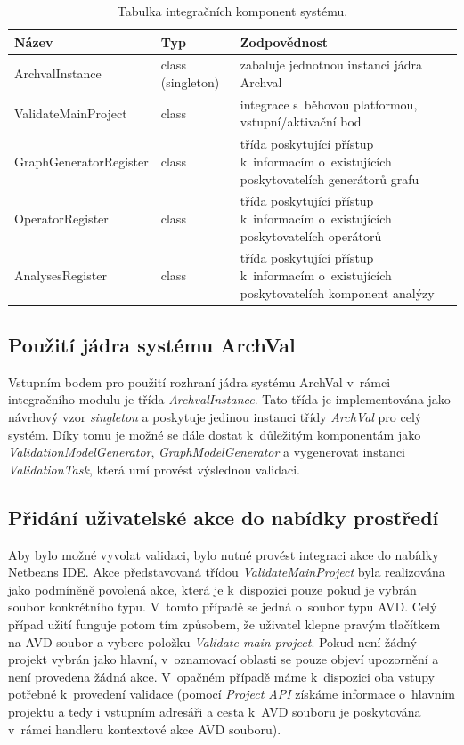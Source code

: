 \begin{table}
  \caption{Tabulka integračních komponent systému. \label{implementation-integration_components}}
  \begin{center}
    \begin{tabular}{ | l | l | p{8cm} | }
      \hline
      \textbf{Název} & \textbf{Typ} & \textbf{Zodpovědnost} \\
      \hline
      \hline
      ArchvalInstance & class (singleton) & zabaluje jednotnou instanci jádra Archval \\ \hline
      ValidateMainProject & class & integrace s~běhovou platformou, vstupní/aktivační bod \\ \hline
      GraphGeneratorRegister & class & třída poskytující přístup k~informacím o~existujících poskytovatelích generátorů grafu \\ \hline
      OperatorRegister & class & třída poskytující přístup k~informacím o~existujících poskytovatelích operátorů \\ \hline
      AnalysesRegister & class & třída poskytující přístup k~informacím o~existujících poskytovatelích komponent analýzy \\ \hline
    \end{tabular}
  \end{center}
\end{table}

\subsection{Použití jádra systému ArchVal}
Vstupním bodem pro použití rozhraní jádra systému ArchVal v~rámci integračního modulu je třída \emph{ArchvalInstance}. Tato třída je implementována jako návrhový vzor \emph{singleton} a poskytuje jedinou instanci třídy \emph{ArchVal} pro celý systém. Díky tomu je možné se dále dostat k~důležitým komponentám jako \emph{ValidationModelGenerator}, \emph{GraphModelGenerator} a vygenerovat instanci \emph{ValidationTask}, která umí provést výslednou validaci.

\subsection{Přidání uživatelské akce do nabídky prostředí}
Aby bylo možné vyvolat validaci, bylo nutné provést integraci akce do nabídky Netbeans IDE. Akce představovaná třídou \emph{ValidateMainProject} byla realizována jako podmíněně povolená akce, která je k~dispozici pouze pokud je vybrán soubor konkrétního typu. V~tomto případě se jedná o~soubor typu AVD. Celý případ užití funguje potom tím způsobem, že uživatel klepne pravým tlačítkem na AVD soubor a vybere položku \emph{Validate main project}. Pokud není žádný projekt vybrán jako hlavní, v~oznamovací oblasti se pouze objeví upozornění a není provedena žádná akce. V~opačném případě máme k~dispozici oba vstupy potřebné k~provedení validace (pomocí \emph{Project API} získáme informace o~hlavním projektu a tedy i vstupním adresáři a cesta k~AVD souboru je poskytována v~rámci handleru kontextové akce AVD souboru).

